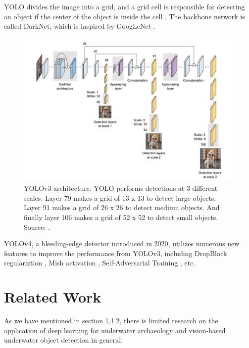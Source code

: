 \documentclass[a4paper,11pt,oneside]{article}
\begin{document}
  YOLO divides the image into a grid, and a grid cell is responsible for detecting an object if the center of the object
  is inside the cell \cite{elgendy2020deep, redmon2016you}. The backbone network is called DarkNet, which is inspired by
  GoogLeNet \cite{elgendy2020deep, redmon2016you}.

  \begin{figure}[ht]
    \begin{center}
      \includegraphics[width=\textwidth]{yolov3.png}
    \end{center}
    \caption{YOLOv3 architecture. YOLO performs detections at 3 different scales. Layer 79 makes a grid of 13 x 13 to
    detect large objects. Layer 91 makes a grid of 26 x 26 to detect medium objects. And finally layer 106 makes a grid
    of 52 x 52 to detect small objects. Source: \cite{elgendy2020deep}.}
  \end{figure}

  YOLOv4, a bleeding-edge detector introduced in 2020, utilizes numerous new features to improve the performance
  from YOLOv3, including DropBlock regulariztion \cite{ghiasi2018dropblock}, Mish activation \cite{misra2019mish},
  Self-Adversarial Training \cite{bochkovskiy2020yolov4}, etc.

  \section{Related Work}

  As we have mentioned in \hyperref[sec:112]{section 1.1.2}, there is limited research on the application of deep learning
  for underwater archaeology and vision-based underwater object detection in general.
\end{document}
